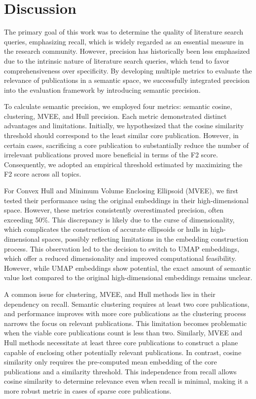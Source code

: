 \section{Discussion}

The primary goal of this work was to determine the quality of literature search queries, emphasizing recall, which is widely regarded as an essential measure in the research community. However, precision has historically been less emphasized due to the intrinsic nature of literature search queries, which tend to favor comprehensiveness over specificity. By developing multiple metrics to evaluate the relevance of publications in a semantic space, we successfully integrated precision into the evaluation framework by introducing semantic precision.

To calculate semantic precision, we employed four metrics: semantic cosine, clustering, MVEE, and Hull precision. Each metric demonstrated distinct advantages and limitations. Initially, we hypothesized that the cosine similarity threshold should correspond to the least similar core publication. However, in certain cases, sacrificing a core publication to substantially reduce the number of irrelevant publications proved more beneficial in terms of the F2 score. Consequently, we adopted an empirical threshold estimated by maximizing the F2 score across all topics.

For Convex Hull and Minimum Volume Enclosing Ellipsoid (MVEE), we first tested their performance using the original embeddings in their high-dimensional space. However, these metrics consistently overestimated precision, often exceeding 50\%. This discrepancy is likely due to the curse of dimensionality, which complicates the construction of accurate ellipsoids or hulls in high-dimensional spaces, possibly reflecting limitations in the embedding construction process. This observation led to the decision to switch to UMAP embeddings, which offer a reduced dimensionality and improved computational feasibility. However, while UMAP embeddings show potential, the exact amount of semantic value lost compared to the original high-dimensional embeddings remains unclear.

A common issue for clustering, MVEE, and Hull methods lies in their dependency on recall. Semantic clustering requires at least two core publications, and performance improves with more core publications as the clustering process narrows the focus on relevant publications. This limitation becomes problematic when the viable core publications count is less than two. Similarly, MVEE and Hull methods necessitate at least three core publications to construct a plane capable of enclosing other potentially relevant publications. In contrast, cosine similarity only requires the pre-computed mean embedding of the core publications and a similarity threshold. This independence from recall allows cosine similarity to determine relevance even when recall is minimal, making it a more robust metric in cases of sparse core publications.





